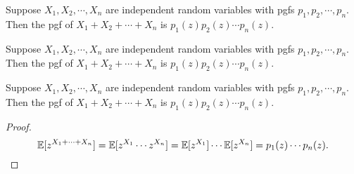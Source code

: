 \begin{note}
  \begin{field}
    \begin{thm}
      Suppose $X_1, X_2, \cdots, X_n$ are independent random variables with pgfs $p_1, p_2, \cdots, p_n$. Then the pgf of $X_1 + X_2 + \cdots + X_n$ is $p_1(z)p_2(z)\cdots p_n(z)$.
    \end{thm}
  \end{field}
  \begin{field}
    \begin{thm}
      Suppose $X_1, X_2, \cdots, X_n$ are independent random variables with pgfs $p_1, p_2, \cdots, p_n$. Then the pgf of $X_1 + X_2 + \cdots + X_n$ is $p_1(z)p_2(z)\cdots p_n(z)$.
    \end{thm}
  \end{field}
  \xplain{}%
\end{note}

%
\begin{note}
  \begin{field}
    \begin{thm}
      Suppose $X_1, X_2, \cdots, X_n$ are independent random variables with pgfs $p_1, p_2, \cdots, p_n$. Then the pgf of $X_1 + X_2 + \cdots + X_n$ is $p_1(z)p_2(z)\cdots p_n(z)$.
    \end{thm}
  \end{field}
  \begin{field}
    \begin{proof}
      \[
        \mathbb{E}[z^{X_1 + \cdots + X_n}] = \mathbb{E}[z^{X_1}\cdots z^{X_n}] = \mathbb{E}[z^{X_1}]\cdots\mathbb{E}[z^{X_n}] = p_1(z)\cdots p_n(z).\qedhere
      \]
    \end{proof}
  \end{field}
  \xplain{}%
\end{note}


